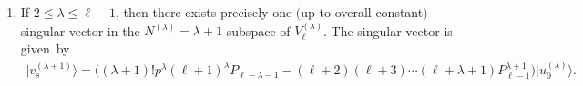 \documentclass[pdftex]{sigma}
\numberwithin{equation}{section}
\begin{document}
\begin{lemma}
\begin{enumerate}
\begin{gather}
\end{gather}
This implies that there exists no singular vectors in the level $ N^{(\lambda)} $ subspaces if $ 1 {\leq} N^{(\lambda)}
{\leq} \lambda$.
\item[$iii)$] If $ 2 \leq \lambda \leq \ell-1$, then there exists precisely one $($up to overall constant$)$ singular vector in the
$ N^{(\lambda)} = \lambda + 1 $ subspace of $ V^{(\lambda)}_{\ell}$.
The singular vector is given~by
\begin{gather}
\big|v_s^{(\lambda{+}1)}\big\rangle  = \big(  (\lambda+1)!  p^{\lambda} (\ell+1)^{\lambda} P_{\ell{-}\lambda{-}1} \!- (\ell+2) (\ell+3)
\cdots (\ell+\lambda+1) P_{\ell{-}1}^{\lambda{+}1}  \big)\! \big|u_0^{(\lambda)}\big\rangle .\!\!\!\!
\label{SVinQuotientSpace}
\end{gather}
\end{enumerate}
\end{lemma}
\end{document}
